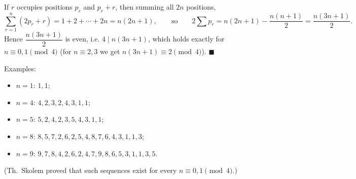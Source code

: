 If $r$ occupies positions $p_r$ and $p_r+r$, then summing all $2n$ positions,
\[\sum_{r=1}^{n}(2p_r+r)=1+2+\cdots+2n=n(2n+1),\qquad\text{so}\qquad2\sum p_r=n(2n+1)-\dfrac{n(n+1)}{2}=\dfrac{n(3n+1)}{2}.\]
Hence $\dfrac{n(3n+1)}{2}$ is even, i.e. $4\mid n(3n+1)$, which holds exactly for $n\equiv0,1\pmod4$ (for $n\equiv2,3$ we get $n(3n+1)\equiv2\pmod4$). $\blacksquare$

Examples:
\begin{itemize}
\item $n=1$: $1,1$;
\item $n=4$: $4,2,3,2,4,3,1,1$;
\item $n=5$: $5,2,4,2,3,5,4,3,1,1$;
\item $n=8$: $8,5,7,2,6,2,5,4,8,7,6,4,3,1,1,3$;
\item $n=9$: $9,7,8,4,2,6,2,4,7,9,8,6,5,3,1,1,3,5$.
\end{itemize}
(Th.~Skolem proved that such sequences exist for every $n\equiv0,1\pmod4$.)
